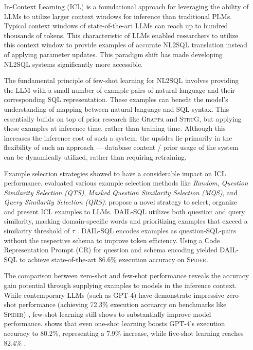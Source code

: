 \documentclass{article}
\begin{document}
In-Context Learning (ICL) is a foundational approach for leveraging the ability of LLMs to utilize larger context windows for
inference than traditional PLMs. Typical context windows of state-of-the-art LLMs can reach up to hundred thousands of tokens.
This characteristic of LLMs enabled researchers to utilize this context window to provide examples of accurate NL2SQL translation
instead of applying parameter updates. This paradigm shift has made developing NL2SQL systems significantly more accessible.

The fundamental principle of few-shot learning for NL2SQL involves providing the LLM with a small number of example pairs
of natural language and their corresponding SQL representation. These examples can benefit the model's understanding of
mapping between natural language and SQL syntax. This essentially builds on top of prior research like \textsc{Grappa}
and \textsc{StruG}, but applying these examples at inference time, rather than training time. Although this increases
the inference cost of such a system, the upsides lie primarily in the flexibility of such an approach — database content
/ prior usage of the system can be dynamically utilized, rather than requiring retraining.

Example selection strategies showed to have a considerable impact on ICL performance. \cite{DAIL-SQL} evaluated
various example selection methods like \textit{Random}, \textit{Question Similarity Selection (QTS)}, 
\textit{Masked Question Similarity Selection (MQS)}, and \textit{Query Similarity Selection (QRS)}. \citeauthor*{DAIL-SQL}
propose a novel strategy to select, organize and present ICL examples to LLMs. DAIL-SQL utilizes both question and
query similarity, masking domain-specific words and prioritizing examples that exceed a similarity threshold of $\tau$
\citep[p.~5]{DAIL-SQL}. DAIL-SQL encodes examples as question-SQL-pairs without the respective schema to improve
token efficiency. Using a Code Representation Prompt (CR) for question and schema encoding yielded DAIL-SQL to achieve
state-of-the-art 86.6\% execution accuracy on \textsc{Spider}.

The comparison between zero-shot and few-shot performance reveals the accuracy gain potential through supplying examples
to models in the inference context. While contemporary LLMs (such as GPT-4) have demonstrate impressive zero-shot performance
(achieving 72.3\% execution accuarcy on benchmarks like \textsc{Spider}) \citep[Table 1, p.~8]{DAIL-SQL}, few-shot learning 
still shows to substantially improve model performance. \cite{DAIL-SQL} shows that even one-shot learning boosts GPT-4's
execution accuracy to 80.2\%, representing a 7.9\% increase, while five-shot learning reaches 82.4\% \citep[Table 2, p.~8]{DAIL-
SQL}. 
\end{document}
